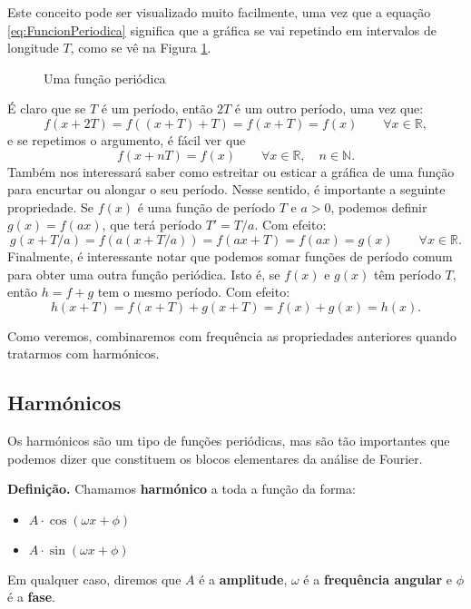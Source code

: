 Este conceito pode ser visualizado muito facilmente, uma vez que a equação \eqref{eq:FuncionPeriodica} significa que a gráfica se vai repetindo em intervalos de longitude $T$, como se vê na Figura \ref{fig:FuncionPeriodica}.

\begin{figure}[h]
\begin{figurebox}
    \vspace{5pt}
    \centering
    \scalebox{0.4}{ }
    \vspace{-10pt}
    \caption{Uma função periódica}
    \label{fig:FuncionPeriodica}
\end{figurebox}
\end{figure}

É claro que se $T$ é um período, então $2T$ é um outro período, uma vez que:
\[
f(x+2T) = f((x+T)+T) = f(x+T) = f(x)\qquad \forall x\in \mathbb{R},
\]
e se repetimos o argumento, é fácil ver que
\begin{equation}
  \label{eq:MultiploPeriodo}
  f(x+nT) = f(x) \qquad \forall x\in\mathbb{R},\quad n\in\mathbb{N}.
\end{equation}
Também nos interessará saber como estreitar ou esticar a gráfica de uma função para encurtar ou alongar o seu período. Nesse sentido, é importante a seguinte propriedade. Se $f(x)$ é uma função de período $T$ e $a>0$, podemos definir $g(x) = f(ax)$, que terá período $T' = T/a$. Com efeito:
\begin{equation}
  \label{eq:EstirarPeriodo}
  g(x+T/a) = f(a(x+T/a)) = f(ax + T) = f(ax) = g(x) \qquad \forall x\in \mathbb{R} .
\end{equation}
Finalmente, é interessante notar que podemos somar funções de período comum para obter uma outra função periódica. Isto é, se $f(x)$ e $g(x)$ têm período $T$, então $h = f+g$ tem o mesmo período. Com efeito:
\begin{equation}
  \label{eq:somaPeriodicas}
  h(x+T) = f(x+T) + g(x+T) = f(x) + g(x) = h(x).
\end{equation}

Como veremos, combinaremos com frequência as propriedades anteriores quando tratarmos com harmónicos.



\subsection{Harmónicos}
Os harmónicos são um tipo de funções periódicas, mas são tão importantes que podemos dizer que constituem os blocos elementares da análise de Fourier.
\begin{mybox}
\textbf{Definição.} Chamamos \textbf{harmónico} a toda a função da forma:
\begin{itemize}
  \item $A\cdot \cos(\omega x + \phi)$
  \item $A\cdot \sin(\omega x + \phi)$
\end{itemize}
Em qualquer caso, diremos que $A$ é a \textbf{amplitude}, $\omega$ é a \textbf{frequência angular} e $\phi$ é a \textbf{fase}.
\end{mybox}

